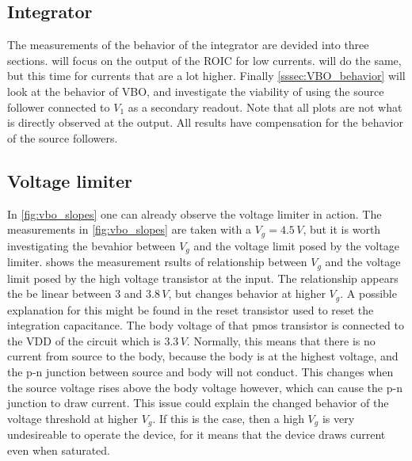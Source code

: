 \subsection{Integrator}\label{ssec:dynamic_integrator}
The measurements of the behavior of the integrator are devided into three sections.  will focus on the output of the ROIC for low currents.  will do the same, but this time for currents that are a lot higher. Finally \cref{sssec:VBO_behavior} will look at the behavior of VBO, and investigate the viability of using the source follower connected to $V_1$ as a secondary readout. Note that all plots are not what is directly observed at the output. All results have compensation for the behavior of the source followers.







\clearpage
\subsection{Voltage limiter}\label{ssec:dynamic_voltage_limiter}
In \cref{fig:vbo_slopes} one can already observe the voltage limiter in action. The measurements in \cref{fig:vbo_slopes} are taken with a $V_g=4.5\,V$, but it is worth investigating the bevahior between $V_g$ and the voltage limit posed by the voltage limiter.  shows the measurement rsults of relationship between $V_g$ and the voltage limit posed by the high voltage transistor at the input. The relationship appears the be linear between 3 and $3.8\,V$, but changes behavior at higher $V_g$. A possible explanation for this might be found in the reset transistor used to reset the integration capacitance. The body voltage of that pmos transistor is connected to the VDD of the circuit which is $3.3\,V$. Normally, this means that there is no current from source to the body, because the body is at the highest voltage, and the p-n junction between source and body will not conduct. This changes when the source voltage rises above the body voltage however, which can cause the p-n junction to draw current. This issue could explain the changed behavior of the voltage threshold at higher $V_g$. If this is the case, then a high $V_g$ is very undesireable to operate the device, for it means that the device draws current even when saturated. 

